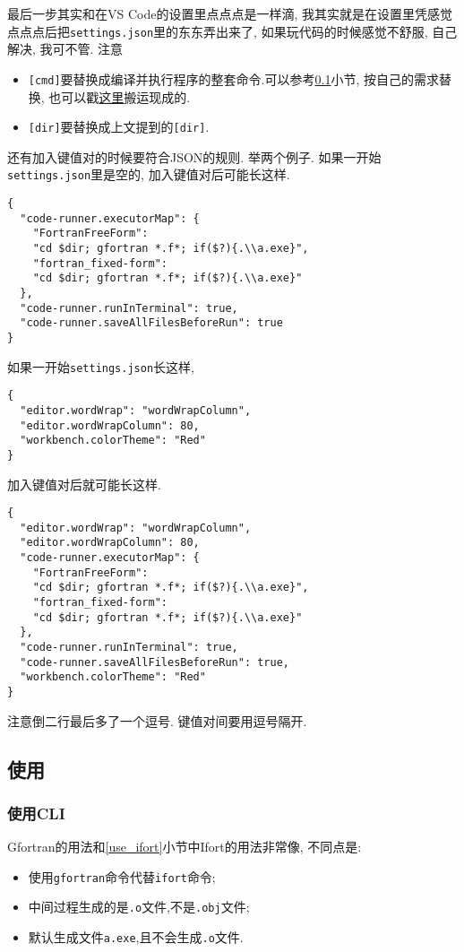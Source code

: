 最后一步其实和在VS Code的设置里点点点是一样滴, 我其实就是在设置里凭感觉点点点后把\verb|settings.json|里的东东弄出来了, 如果玩代码的时候感觉不舒服, 自己解决, 我可不管. 注意
\begin{itemize}
    \item \verb|[cmd]|要替换成编译并执行程序的整套命令.可以参考\ref{use_gfortran}小节, 按自己的需求替换, 也可以戳\href{https://zhuanlan.zhihu.com/p/362328064}{这里}搬运现成的.
    \item \verb|[dir]|要替换成上文提到的\verb|[dir]|.
\end{itemize}

还有加入键值对的时候要符合JSON的规则. 举两个例子.
如果一开始\verb|settings.json|里是空的, 加入键值对后可能长这样.
\begin{lstlisting}
{
  "code-runner.executorMap": {
    "FortranFreeForm":
    "cd $dir; gfortran *.f*; if($?){.\\a.exe}",
    "fortran_fixed-form":
    "cd $dir; gfortran *.f*; if($?){.\\a.exe}"
  },
  "code-runner.runInTerminal": true,
  "code-runner.saveAllFilesBeforeRun": true
}
\end{lstlisting}
如果一开始\verb|settings.json|长这样,
\begin{lstlisting}
{
  "editor.wordWrap": "wordWrapColumn",
  "editor.wordWrapColumn": 80,
  "workbench.colorTheme": "Red"
}
\end{lstlisting}
加入键值对后就可能长这样.
\begin{lstlisting}
{
  "editor.wordWrap": "wordWrapColumn",
  "editor.wordWrapColumn": 80,
  "code-runner.executorMap": {
    "FortranFreeForm":
    "cd $dir; gfortran *.f*; if($?){.\\a.exe}",
    "fortran_fixed-form":
    "cd $dir; gfortran *.f*; if($?){.\\a.exe}"
  },
  "code-runner.runInTerminal": true,
  "code-runner.saveAllFilesBeforeRun": true,
  "workbench.colorTheme": "Red"
}
\end{lstlisting}
注意倒二行最后多了一个逗号. 键值对间要用逗号隔开.

\subsection{使用}\label{use_gfortran}

\subsubsection{使用CLI}
Gfortran的用法和\ref{use_ifort}小节中Ifort的用法非常像, 不同点是:
\begin{itemize}
  \item 使用\verb|gfortran|命令代替\verb|ifort|命令;
  \item 中间过程生成的是\verb|.o|文件,不是\verb|.obj|文件;
  \item 默认生成文件\verb|a.exe|,且不会生成\verb|.o|文件.
\end{itemize}

